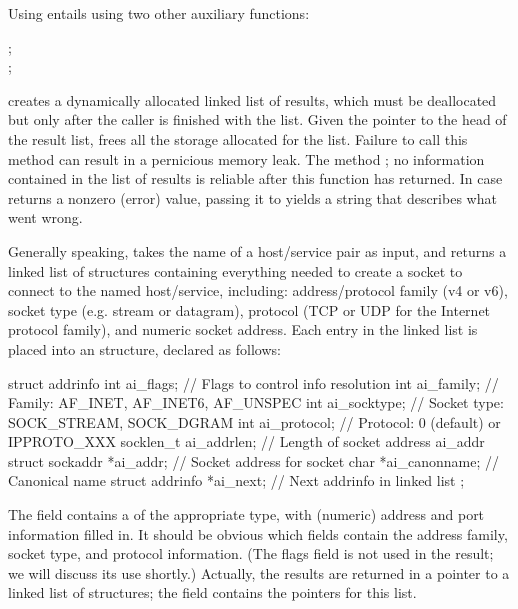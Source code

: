 Using  entails using two other auxiliary functions:

\begin{inlinefcn}
%
;\\
%
;
\end{inlinefcn}

\noindent {} creates a dynamically allocated linked list of 
results, which must be deallocated but only after the caller is
finished with the list.  Given the pointer to the head of the result list, 
 frees all the storage
allocated for the list.  Failure to call this method
can result in a pernicious memory leak.  The method ; no information contained in the list of results is
reliable after this function has returned.
%
In case  returns a nonzero (error) value,
passing it to
 yields a string that describes what went wrong.

Generally speaking, 
takes the name of a host/service pair as input,
and returns a linked list of structures containing everything needed
to create a socket to connect to the named host/service, including:
address/protocol family (v4 or v6), socket type
(e.g. stream or datagram), protocol (TCP or UDP for the Internet
protocol family), and numeric socket address.
%
Each entry in the linked list is placed
into an  structure, declared as follows:
%
\begin{inlinecode}
struct addrinfo {
  int ai_flags;             // Flags to control info resolution
  int ai_family;            // Family:  AF_INET, AF_INET6, AF_UNSPEC
  int ai_socktype;          // Socket type:  SOCK_STREAM, SOCK_DGRAM
  int ai_protocol;          // Protocol: 0 (default) or IPPROTO_XXX
  socklen_t ai_addrlen;     // Length of socket address ai_addr
  struct sockaddr *ai_addr; // Socket address for socket
  char *ai_canonname;       // Canonical name
  struct addrinfo *ai_next; // Next addrinfo in linked list
};
\end{inlinecode}
%
The  field contains a  of the
appropriate type, with (numeric) address and port information filled in.
It should be obvious which fields contain
the address family, socket type, and protocol information. (The flags
field is not used in the result; we will discuss its use shortly.)
Actually, the results are returned in a pointer to a linked list of
structures; the  field contains the pointers for this list.

